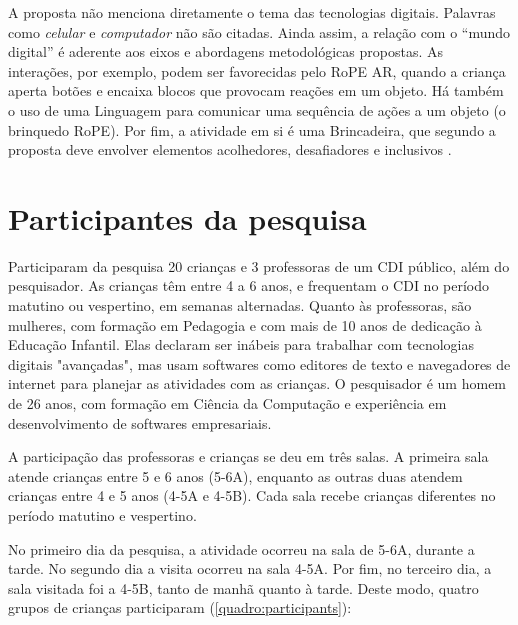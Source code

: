A proposta não menciona diretamente o tema das tecnologias digitais. Palavras como \textit{celular} e \textit{computador} não são citadas. Ainda assim, a relação com o “mundo digital” é aderente aos eixos e abordagens metodológicas propostas. As interações, por exemplo, podem ser favorecidas pelo RoPE AR, quando a criança aperta botões e encaixa blocos que provocam reações em um objeto. Há também o uso de uma Linguagem para comunicar uma sequência de ações a um objeto (o brinquedo RoPE). Por fim, a atividade em si é uma Brincadeira, que segundo a proposta deve envolver elementos acolhedores, desafiadores e inclusivos \cite[p.50]{gaspar_proposta_2010}.


\section{Participantes da pesquisa}
\label{sec:participantes}

Participaram da pesquisa 20 crianças e 3 professoras de um CDI público, além do pesquisador. As crianças têm entre 4 a 6 anos, e frequentam o CDI no período matutino ou vespertino, em semanas alternadas. Quanto às professoras, são mulheres, com formação em Pedagogia e com mais de 10 anos de dedicação à Educação Infantil. Elas declaram ser inábeis para trabalhar com tecnologias digitais "avançadas", mas usam softwares como editores de texto e navegadores de internet para planejar as atividades com as crianças. O pesquisador é um homem de 26 anos, com formação em Ciência da Computação e experiência em desenvolvimento de softwares empresariais.

A participação das professoras e crianças se deu em três salas. A primeira sala atende crianças entre 5 e 6 anos (5-6A), enquanto as outras duas atendem crianças entre 4 e 5 anos (4-5A e 4-5B). Cada sala recebe crianças diferentes no período matutino e vespertino.

No primeiro dia da pesquisa, a atividade ocorreu na sala de 5-6A, durante a tarde. No segundo dia a visita ocorreu na sala 4-5A. Por fim, no terceiro dia, a sala visitada foi a 4-5B, tanto de manhã quanto à tarde. Deste modo, quatro grupos de crianças participaram (\autoref{quadro:participants}):

